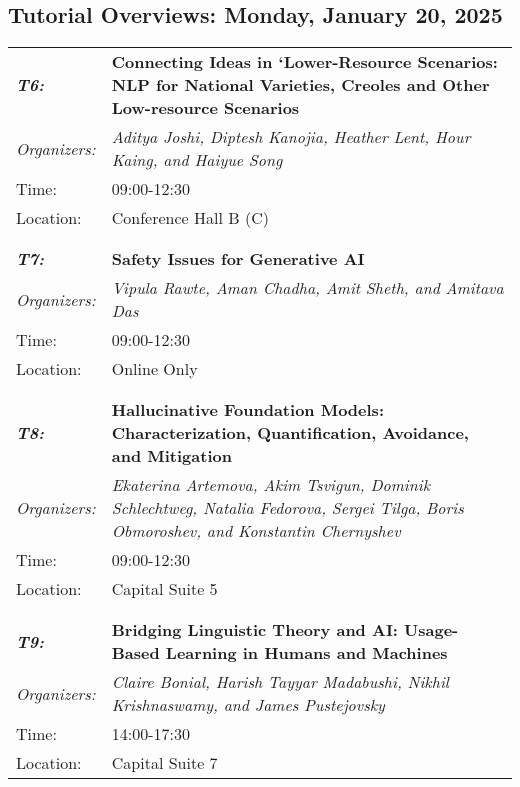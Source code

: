 \subsection{Tutorial Overviews: Monday, January 20, 2025}
\begin{longtable}{p{15mm}p{100mm}}
\emph{\textbf{T6:}} & \textbf{Connecting Ideas in ‘Lower-Resource Scenarios: NLP for National Varieties, Creoles and Other Low-resource Scenarios} \\
\emph{Organizers:} & \emph{Aditya Joshi, Diptesh Kanojia, Heather Lent, Hour Kaing, and Haiyue Song} \\
Time: & 09:00-12:30 \\
Location: & Conference Hall B (C) \\\\
\hline\\
\emph{\textbf{T7:}} & \textbf{Safety Issues for Generative AI} \\
\emph{Organizers:} & \emph{Vipula Rawte, Aman Chadha, Amit Sheth, and Amitava Das} \\
Time: & 09:00-12:30 \\
Location: & Online Only \\\\
\hline\\
\emph{\textbf{T8:}} & \textbf{Hallucinative Foundation Models: Characterization, Quantification, Avoidance, and Mitigation} \\
\emph{Organizers:} & \emph{Ekaterina Artemova, Akim Tsvigun, Dominik Schlechtweg, Natalia Fedorova, Sergei Tilga, Boris Obmoroshev, and Konstantin Chernyshev} \\
Time: & 09:00-12:30 \\
Location: & Capital Suite 5 \\\\
\hline\\
\emph{\textbf{T9:}} & \textbf{Bridging Linguistic Theory and AI: Usage-Based Learning in Humans and Machines} \\
\emph{Organizers:} & \emph{Claire Bonial, Harish Tayyar Madabushi, Nikhil Krishnaswamy, and James Pustejovsky} \\
Time: & 14:00-17:30 \\
Location: & Capital Suite 7 \\
\end{longtable}